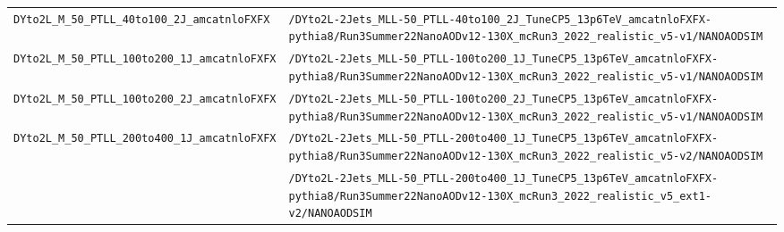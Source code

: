 \begin{longtable}{@{}>{\RaggedRight\arraybackslash}p{} >{\RaggedRight\arraybackslash}p{}@{}}
\addlinespace[2pt]
\texttt{DYto2L\_\allowbreak{}M\_\allowbreak{}50\_\allowbreak{}PTLL\_\allowbreak{}40to100\_\allowbreak{}2J\_\allowbreak{}amcatnloFXFX} & \texttt{/\allowbreak{}DYto2L-\allowbreak{}2Jets\_\allowbreak{}MLL-\allowbreak{}50\_\allowbreak{}PTLL-\allowbreak{}40to100\_\allowbreak{}2J\_\allowbreak{}TuneCP5\_\allowbreak{}13p6TeV\_\allowbreak{}amcatnloFXFX-\allowbreak{}pythia8/\allowbreak{}Run3Summer22NanoAODv12-\allowbreak{}130X\_\allowbreak{}mcRun3\_\allowbreak{}2022\_\allowbreak{}realistic\_\allowbreak{}v5-\allowbreak{}v1/\allowbreak{}NANOAODSIM} \\
\addlinespace[2pt]
\texttt{DYto2L\_\allowbreak{}M\_\allowbreak{}50\_\allowbreak{}PTLL\_\allowbreak{}100to200\_\allowbreak{}1J\_\allowbreak{}amcatnloFXFX} & \texttt{/\allowbreak{}DYto2L-\allowbreak{}2Jets\_\allowbreak{}MLL-\allowbreak{}50\_\allowbreak{}PTLL-\allowbreak{}100to200\_\allowbreak{}1J\_\allowbreak{}TuneCP5\_\allowbreak{}13p6TeV\_\allowbreak{}amcatnloFXFX-\allowbreak{}pythia8/\allowbreak{}Run3Summer22NanoAODv12-\allowbreak{}130X\_\allowbreak{}mcRun3\_\allowbreak{}2022\_\allowbreak{}realistic\_\allowbreak{}v5-\allowbreak{}v1/\allowbreak{}NANOAODSIM} \\
\addlinespace[2pt]
\texttt{DYto2L\_\allowbreak{}M\_\allowbreak{}50\_\allowbreak{}PTLL\_\allowbreak{}100to200\_\allowbreak{}2J\_\allowbreak{}amcatnloFXFX} & \texttt{/\allowbreak{}DYto2L-\allowbreak{}2Jets\_\allowbreak{}MLL-\allowbreak{}50\_\allowbreak{}PTLL-\allowbreak{}100to200\_\allowbreak{}2J\_\allowbreak{}TuneCP5\_\allowbreak{}13p6TeV\_\allowbreak{}amcatnloFXFX-\allowbreak{}pythia8/\allowbreak{}Run3Summer22NanoAODv12-\allowbreak{}130X\_\allowbreak{}mcRun3\_\allowbreak{}2022\_\allowbreak{}realistic\_\allowbreak{}v5-\allowbreak{}v1/\allowbreak{}NANOAODSIM} \\
\addlinespace[2pt]
\texttt{DYto2L\_\allowbreak{}M\_\allowbreak{}50\_\allowbreak{}PTLL\_\allowbreak{}200to400\_\allowbreak{}1J\_\allowbreak{}amcatnloFXFX} & \texttt{/\allowbreak{}DYto2L-\allowbreak{}2Jets\_\allowbreak{}MLL-\allowbreak{}50\_\allowbreak{}PTLL-\allowbreak{}200to400\_\allowbreak{}1J\_\allowbreak{}TuneCP5\_\allowbreak{}13p6TeV\_\allowbreak{}amcatnloFXFX-\allowbreak{}pythia8/\allowbreak{}Run3Summer22NanoAODv12-\allowbreak{}130X\_\allowbreak{}mcRun3\_\allowbreak{}2022\_\allowbreak{}realistic\_\allowbreak{}v5-\allowbreak{}v2/\allowbreak{}NANOAODSIM} \\
 & \texttt{/\allowbreak{}DYto2L-\allowbreak{}2Jets\_\allowbreak{}MLL-\allowbreak{}50\_\allowbreak{}PTLL-\allowbreak{}200to400\_\allowbreak{}1J\_\allowbreak{}TuneCP5\_\allowbreak{}13p6TeV\_\allowbreak{}amcatnloFXFX-\allowbreak{}pythia8/\allowbreak{}Run3Summer22NanoAODv12-\allowbreak{}130X\_\allowbreak{}mcRun3\_\allowbreak{}2022\_\allowbreak{}realistic\_\allowbreak{}v5\_\allowbreak{}ext1-\allowbreak{}v2/\allowbreak{}NANOAODSIM} \\

\end{longtable}
